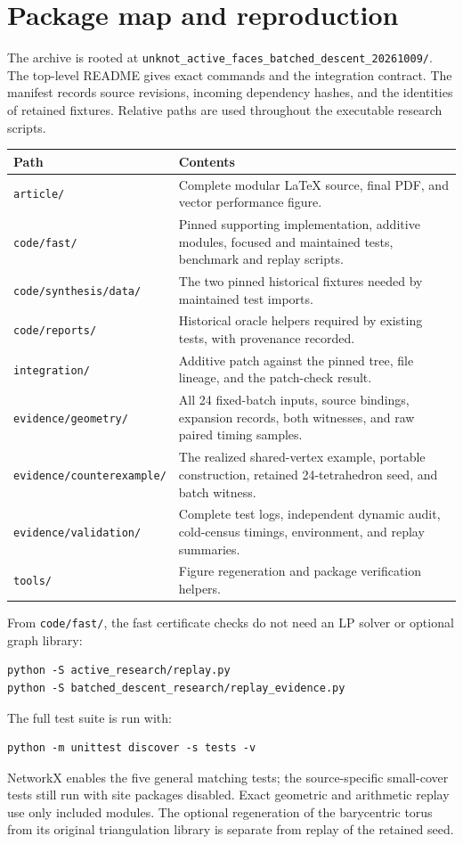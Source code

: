 \section{Package map and reproduction}
\label{sec:reproduction}

The archive is rooted at
\texttt{unknot\_active\_faces\_batched\_descent\_20261009/}.
The top-level README gives exact commands and the integration contract.
The manifest records source revisions, incoming dependency hashes, and
the identities of retained fixtures. Relative paths are used throughout
the executable research scripts.

\begin{longtable}{p{}p{}}
\toprule
Path & Contents \\
\midrule
\endhead
\texttt{article/} & Complete modular \LaTeX{} source, final PDF, and vector
performance figure. \\
\texttt{code/fast/} & Pinned supporting implementation, additive modules,
focused and maintained tests, benchmark and replay scripts. \\
\texttt{code/synthesis/data/} & The two pinned historical fixtures needed
by maintained test imports. \\
\texttt{code/reports/} & Historical oracle helpers required by existing
tests, with provenance recorded. \\
\texttt{integration/} & Additive patch against the pinned tree, file
lineage, and the patch-check result. \\
\texttt{evidence/geometry/} & All 24 fixed-batch inputs, source bindings,
expansion records, both witnesses, and raw paired timing samples. \\
\texttt{evidence/counterexample/} & The realized shared-vertex example,
portable construction, retained 24-tetrahedron seed, and batch witness. \\
\texttt{evidence/validation/} & Complete test logs, independent dynamic
audit, cold-census timings, environment, and replay summaries. \\
\texttt{tools/} & Figure regeneration and package verification helpers. \\
\bottomrule
\end{longtable}

From \texttt{code/fast/}, the fast certificate checks do not need an LP
solver or optional graph library:
\begin{lstlisting}
python -S active_research/replay.py
python -S batched_descent_research/replay_evidence.py
\end{lstlisting}
The full test suite is run with:
\begin{lstlisting}
python -m unittest discover -s tests -v
\end{lstlisting}
NetworkX enables the five general matching tests; the source-specific
small-cover tests still run with site packages disabled. Exact geometric
and arithmetic replay use only included modules. The optional regeneration
of the barycentric torus from its original triangulation library is
separate from replay of the retained seed.

